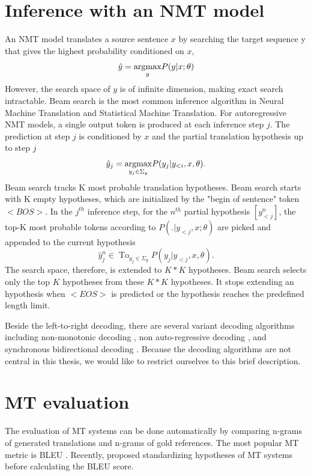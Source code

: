 \section{Inference with an NMT model} \label{sec:inference}
An NMT model translates a source sentence $x$ by searching the target sequence y that gives the highest probability conditioned on $x$,
\begin{equation}
\hat{y} = \displaystyle{\mathop{\operatorname*{argmax}}_{y}} P(y|x;\theta)
\end{equation}
However, the search space of $y$ is of infinite dimension, making exact search intractable. Beam search \citep{Och98improving} is the most common inference algorithm in Neural Machine Translation and Statistical Machine Translation. For autoregressive NMT models, a single output token is produced at each inference step $j$. The prediction at step $j$ is conditioned by $x$ and the partial translation hypothesis up to step $j$
\begin{equation}
\hat{y}_j = \displaystyle{\mathop{\operatorname*{argmax}}_{y_j \in \Sigma_y}} P(y_j|y_{<i},x,\theta).
\end{equation}
Beam search tracks K most probable translation hypotheses. Beam search starts with K empty hypotheses, which are initialized by the "begin of sentence" token $<BOS>$. In the $j^{th}$ inference step,
for the $n^{th}$ partial hypothesis $[y^{n}_{<j}]$, the top-K most probable tokens according to $P(.| y_{<j},x;\theta)$ are picked and appended to the current hypothesis
\begin{equation}
\hat{y}^n_j \in \displaystyle{\mathop{Top_{K}}_{y_j \in \Sigma_y}} P(y_j|y_{<j},x,\theta).
\end{equation}
The search space, therefore, is extended to $K*K$ hypotheses. Beam search selects only the top $K$ hypotheses from these $K*K$ hypotheses. It stops extending an hypothesis when $<EOS>$ is predicted or  the hypothesis reaches the predefined length limit. 

Beside the left-to-right decoding, there are several variant decoding algorithms including non-monotonic decoding \citep{Welleck19non}, non auto-regressive decoding \citep{Jiatao17non}, and synchronous bidirectional decoding \citep{Zhou19synchronous}. Because the decoding algorithms are not central in this thesis, we would like to restrict ourselves to this brief description.
\section{MT evaluation}
The evaluation of MT systems can be done automatically by comparing n-grams of generated translations and n-grams of gold references. The most popular MT metric is BLEU \citep{Papineni02bleu}. Recently, \citet{Post18A} proposed standardizing hypotheses of MT systems before calculating the BLEU score. 

